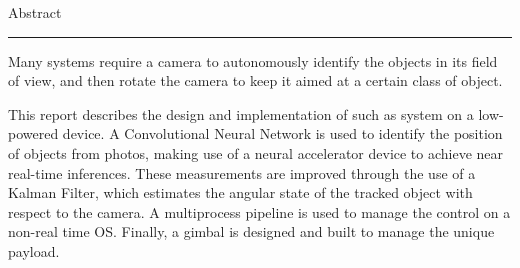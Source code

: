 {\Large Abstract}\\
\hrule


Many systems require a camera to autonomously identify the objects in its field of view, and then rotate the camera to keep it aimed at a certain class of object.

This report describes the design and implementation of such as system on a low-powered device. A Convolutional Neural Network is used to identify the position of objects from photos, making use of a neural accelerator device to achieve near real-time inferences. These measurements are improved through the use of a Kalman Filter, which estimates the angular state of the tracked object with respect to the camera. A multiprocess pipeline is used to manage the control on a non-real time OS. Finally, a gimbal is designed and built to manage the unique payload.

\newpage
